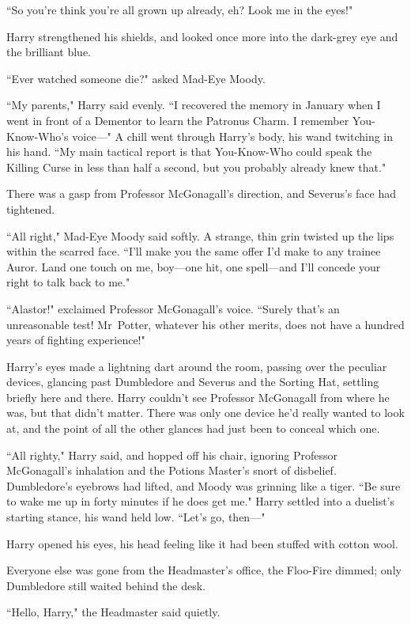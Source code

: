 ``So you're think you're all grown up already, eh? Look me in the eyes!"

Harry strengthened his shields, and looked once more into the dark-grey eye and the brilliant blue.

``Ever watched someone die?" asked Mad-Eye Moody.

``My parents," Harry said evenly. ``I recovered the memory in January when I went in front of a Dementor to learn the Patronus Charm. I remember You-Know-Who's voice—" A chill went through Harry's body, his wand twitching in his hand. ``My main tactical report is that You-Know-Who could speak the Killing Curse in less than half a second, but you probably already knew that."

There was a gasp from Professor McGonagall's direction, and Severus's face had tightened.

``All right," Mad-Eye Moody said softly. A strange, thin grin twisted up the lips within the scarred face. ``I'll make you the same offer I'd make to any trainee Auror. Land one touch on me, boy—one hit, one spell—and I'll concede your right to talk back to me."

``Alastor!" exclaimed Professor McGonagall's voice. ``Surely that's an unreasonable test! Mr~Potter, whatever his other merits, does not have a hundred years of fighting experience!"

Harry's eyes made a lightning dart around the room, passing over the peculiar devices, glancing past Dumbledore and Severus and the Sorting Hat, settling briefly here and there. Harry couldn't see Professor McGonagall from where he was, but that didn't matter. There was only one device he'd really wanted to look at, and the point of all the other glances had just been to conceal which one.

``All righty," Harry said, and hopped off his chair, ignoring Professor McGonagall's inhalation and the Potions Master's snort of disbelief. Dumbledore's eyebrows had lifted, and Moody was grinning like a tiger. ``Be sure to wake me up in forty minutes if he does get me." Harry settled into a duelist's starting stance, his wand held low. ``Let's go, then—"

\later

Harry opened his eyes, his head feeling like it had been stuffed with cotton wool.

Everyone else was gone from the Headmaster's office, the Floo-Fire dimmed; only Dumbledore still waited behind the desk.

``Hello, Harry," the Headmaster said quietly.

